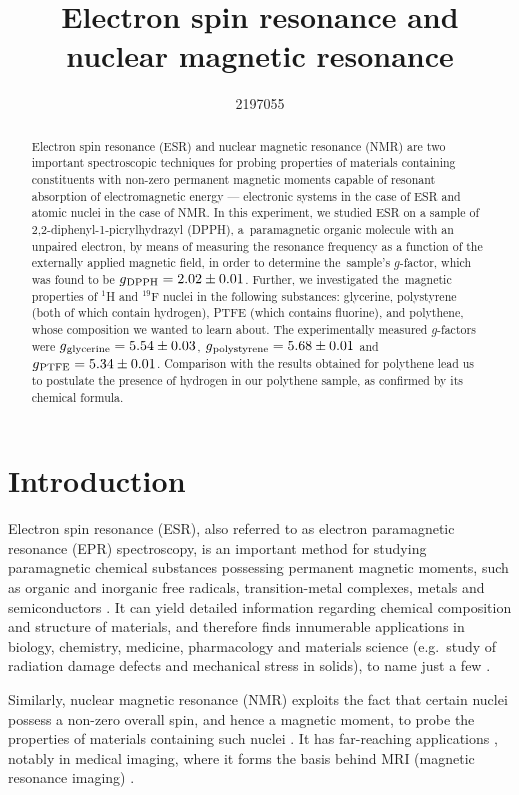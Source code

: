 \documentclass[a4paper]{jpconf}
\numberwithin{equation}{section}
\begin{document}
\title{Electron spin resonance and nuclear magnetic resonance}
\author{2197055}

\begin{abstract}
Electron spin resonance (ESR) and nuclear magnetic resonance (NMR) are two important spectroscopic techniques for probing properties of materials containing constituents with non-zero permanent magnetic moments capable of resonant absorption of electromagnetic energy --- electronic systems in the case of ESR and atomic nuclei in the case of NMR. In this experiment, we studied ESR on a sample of 2,2-diphenyl-1-picrylhydrazyl (DPPH), a~paramagnetic organic molecule with an unpaired electron, by means of measuring the resonance frequency as a function of the externally applied magnetic field, in order to determine the~sample\textquoteright s $g$-factor, which was found to be $g\textsubscript{DPPH} = 2.02 \pm 0.01$.
Further, we investigated the~magnetic properties of ${}^1$H and ${}^{19}$F nuclei in the following substances: glycerine, polystyrene (both of which contain hydrogen), PTFE (which contains fluorine), and polythene, whose composition we wanted to learn about. The experimentally measured $g$-factors were $g\textsubscript{glycerine} = 5.54 \pm 0.03$, $g\textsubscript{polystyrene} = 5.68 \pm 0.01$ and $g\textsubscript{PTFE} = 5.34 \pm 0.01$. Comparison with the results obtained for polythene lead us to postulate the presence of hydrogen in our polythene sample, as confirmed by its chemical formula.
\end{abstract}

\section{Introduction}
Electron spin resonance (ESR), also referred to as electron paramagnetic resonance (EPR) spectroscopy,      
is an important method for studying paramagnetic chemical substances possessing permanent magnetic moments, such as organic and inorganic free radicals, transition-metal complexes, metals and semiconductors \cite{Lancaster}. It can yield detailed information regarding chemical composition and structure of materials, and therefore finds innumerable applications in biology, chemistry, medicine, pharmacology and materials science (e.g.\ study of radiation damage defects and mechanical stress in solids), to name just a few \cite{Lancaster}.

Similarly, nuclear magnetic resonance (NMR) exploits the fact that certain nuclei possess a non-zero overall spin, and hence a magnetic moment, to probe the properties of materials containing such nuclei \cite{Smith}. It has far-reaching applications \cite{Gero}, notably in medical imaging, where it forms the basis behind MRI (magnetic resonance imaging) \cite{Haidekker}.
\end{document}
